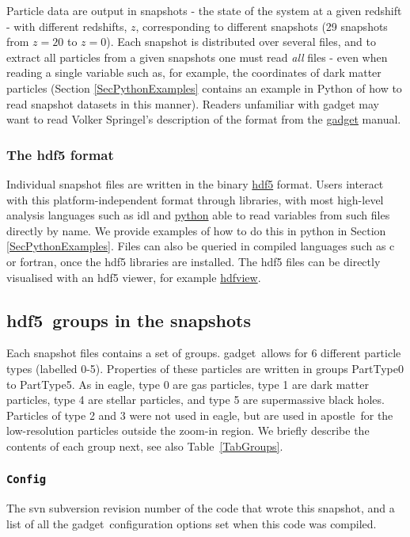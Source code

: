 \documentclass[10pt, a4paper]{article}
\newcommand{\eagle}{{\sc eagle}}
\newcommand{\apostle}{{\sc apostle}}
\newcommand{\hdf}{{\sc hdf5}}
\newcommand{\gadget}{{\sc gadget}}
\begin{document}
Particle data are output in snapshots - the state of the system at a given
redshift - with different redshifts, $z$, corresponding to different snapshots
(29 snapshots from $z=20$ to $z=0$). Each snapshot is distributed over several
files, and to extract all particles from a given snapshots one must read {\em
all} files - even when reading a single variable such as, for example, the
coordinates of dark matter particles (Section \ref{SecPythonExamples}
contains an example in {\sc Python} of how to read snapshot datasets in this
manner). Readers unfamiliar with {\sc gadget} may want to read Volker Springel's
description of the format from the
{\color{blue}\href{https://wwwmpa.mpa-garching.mpg.de/gadget/users-guide.pdf}{\sc
gadget} manual}.

\subsubsection{The {\sc hdf5} format}
Individual snapshot files are written in the binary
{\color{blue}\href{https://www.hdfgroup.org/HDF5/}{\sc hdf5} format}. Users
interact with this platform-independent format through libraries, with most
high-level analysis languages such as {\sc idl} and
{\color{blue}\href{https://www.python.org/}{\sc python}} able to read variables
from such files directly by name. We provide examples of how to do this in {\sc
python} in Section \ref{SecPythonExamples}.  Files can also be queried in
compiled languages such as {\sc c} or {\sc fortran}, once the {\sc hdf5}
libraries are installed. The {\sc hdf5} files can be directly visualised with
an {\sc hdf5} viewer, for example
{\color{blue}\href{https://www.hdfgroup.org/hdf-java-html/hdfview/}{hdfview}}.

\subsection{\hdf\ groups in the snapshots}
\label{SecFOF}
Each snapshot files contains a set of groups. \gadget\ allows for 6 different
particle types (labelled 0-5). Properties of these particles are written in
groups PartType0 to PartType5. As in \eagle, type 0 are gas particles, type 1 are
dark matter particles, type 4 are stellar particles, and type 5 are
supermassive black holes. Particles of type 2 and 3 were not used in \eagle, but are
used in \apostle\ for the low-resolution particles outside the zoom-in region. We briefly describe the
contents of each group next, see also Table~\ref{TabGroups}.

\subsubsection{\texttt{Config}}
The svn subversion revision number of the code that wrote this snapshot, and a
list of all the \gadget\ configuration options set when this code was compiled.
\end{document}
